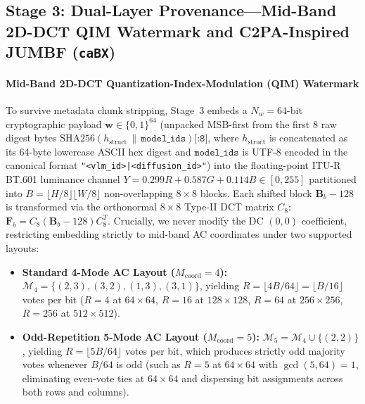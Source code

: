 \documentclass[conference,10pt]{IEEEtran}
\begin{document}
\subsection{Stage 3: Dual-Layer Provenance---Mid-Band 2D-DCT QIM Watermark and C2PA-Inspired JUMBF (\texttt{caBX})}
\paragraph{Mid-Band 2D-DCT Quantization-Index-Modulation (QIM) Watermark}
To survive metadata chunk stripping, Stage~3 embeds a $N_w = 64$-bit cryptographic payload $\mathbf{w} \in \{0,1\}^{64}$ (unpacked MSB-first from the first 8 raw digest bytes $\mathrm{SHA256}(h_{\text{struct}} \,\|\, \texttt{model\_ids})\texttt{[:8]}$, where $h_{\text{struct}}$ is concatenated as its 64-byte lowercase ASCII hex digest and $\texttt{model\_ids}$ is UTF-8 encoded in the canonical format \texttt{"<vlm\_id>|<diffusion\_id>"}) into the floating-point ITU-R BT.601 luminance channel $Y = 0.299R + 0.587G + 0.114B \in [0, 255]$ partitioned into $B = \lfloor H/8 \rfloor \lfloor W/8 \rfloor$ non-overlapping $8\times 8$ blocks. Each shifted block $\mathbf{B}_b - 128$ is transformed via the orthonormal $8\times 8$ Type-II DCT matrix $C_8$: $\mathbf{F}_b = C_8 (\mathbf{B}_b - 128) C_8^T$. Crucially, we never modify the DC $(0,0)$ coefficient, restricting embedding strictly to mid-band AC coordinates under two supported layouts:
\begin{itemize}
    \item \textbf{Standard 4-Mode AC Layout ($M_{\text{coord}} = 4$):} $\mathcal{M}_4 = \{(2,3), (3,2), (1,3), (3,1)\}$, yielding $R = \lfloor 4B/64 \rfloor = \lfloor B/16 \rfloor$ votes per bit ($R=4$ at $64\times 64$, $R=16$ at $128\times 128$, $R=64$ at $256\times 256$, $R=256$ at $512\times 512$).
    \item \textbf{Odd-Repetition 5-Mode AC Layout ($M_{\text{coord}} = 5$):} $\mathcal{M}_5 = \mathcal{M}_4 \cup \{(2,2)\}$, yielding $R = \lfloor 5B/64 \rfloor$ votes per bit, which produces strictly odd majority votes whenever $B/64$ is odd (such as $R=5$ at $64\times 64$ with $\gcd(5, 64) = 1$, eliminating even-vote ties at $64\times 64$ and dispersing bit assignments across both rows and columns).
\end{itemize}
\end{document}
